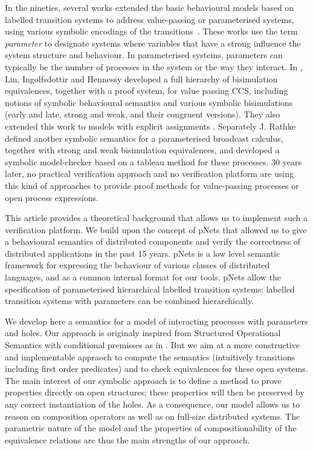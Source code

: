 \documentclass{lmcs}
\begin{document}
In the nineties, several 
works extended the basic behavioural models based on labelled
transition systems to address value-passing or parameterised systems, using
various symbolic encodings of the
transitions~\cite{deSimone85,Larsen87}. 
These works use the term \emph{parameter} to designate systems where variables that have a strong influence the system structure and behaviour. In parameterised systems, parameters can typically be the number of processes in the system or the way they interact.
In \cite{IngolfsdottirL:2001,HennessyLin:TCS95}, Lin, Ingolfsdottir and Hennessy developed a full hierarchy of
bisimulation equivalences, together with a proof system, for value passing CCS,
including notions of symbolic behavioural semantics and various symbolic 
bisimulations (early and late, strong and weak, and their congruent versions). They also extended this work to models with explicit assignments \cite{Linconcur96}.
Separately J. Rathke~\cite{HennessyRathke:TCS98} defined another symbolic semantics for 
a parameterised broadcast calculus, together with strong and weak bisimulation
equivalences, and developed a symbolic model-checker based on a tableau
method for these processes. 30 years later, no
practical verification approach and no verification platform are
using this kind of approaches to provide proof methods for
value-passing processes or open process expressions. 


This article provides a theoretical background that allows us to implement such a verification 
platform. We build upon the concept of pNets that allowed us to give a behavioural semantics 
of distributed components and verify the correctness of distributed applications in the past 15 years. pNets  is a
low level semantic framework for expressing the behaviour of various
classes of distributed languages, and as a common internal format for
our tools.  pNets allow the
specification of parameterised hierarchical labelled
transition systems:  labelled transition systems with parameters can be
combined hierarchically.


We develop here a semantics for a model of interacting processes with parameters and holes. 
Our approach is originaly inspired from Structured Operational Semantics with conditional premisses as in \cite{GROOTE1993263,VANGLABBEEK2004229}.
But we aim at a more constructive and implementable appraoch to compute the semantics (intuitively transitions including first order predicates) and to 
check equivalences for these open systems.
The main interest of our symbolic approach is to define a method to
prove properties directly on open structures; these properties will then be preserved
by any correct instantiation of the holes.
As a consequence, our model allows us to reason on composition
operators as well as on full-size distributed systems. The parametric
nature of the model and the properties of compositionability of the
equivalence relations are thus  the main
strengths of  our approach. 
\end{document}
